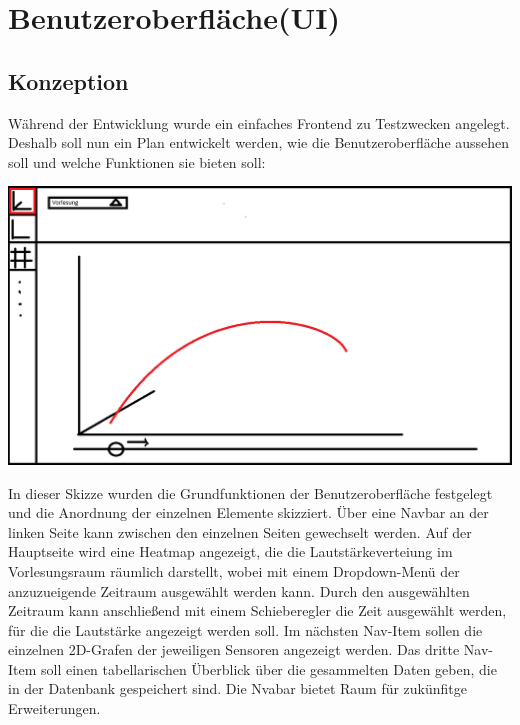 \chapter{Benutzeroberfläche(UI)}
\section{Konzeption}
Während der Entwicklung wurde ein einfaches Frontend zu Testzwecken angelegt. 
Deshalb soll nun ein Plan entwickelt werden, wie die Benutzeroberfläche aussehen soll und welche Funktionen sie bieten soll:
\begin{center}
  \includegraphics[width=1\textwidth]{../images/UI/SkizzeUI.png}
\end{center}
In dieser Skizze wurden die Grundfunktionen der Benutzeroberfläche festgelegt und die Anordnung der einzelnen Elemente skizziert.
Über eine Navbar an der linken Seite kann zwischen den einzelnen Seiten gewechselt werden. 
Auf der Hauptseite wird eine Heatmap angezeigt, die die Lautstärkeverteiung im Vorlesungsraum räumlich darstellt, wobei mit einem Dropdown-Menü der anzuzueigende Zeitraum ausgewählt werden kann.
Durch den ausgewählten Zeitraum kann anschließend mit einem Schieberegler die Zeit ausgewählt werden, für die die Lautstärke angezeigt werden soll.
Im nächsten Nav-Item sollen die einzelnen 2D-Grafen der jeweiligen Sensoren angezeigt werden. 
Das dritte Nav-Item soll einen tabellarischen Überblick über die gesammelten Daten geben, die in der Datenbank gespeichert sind.
Die Nvabar bietet Raum für zukünfitge Erweiterungen.